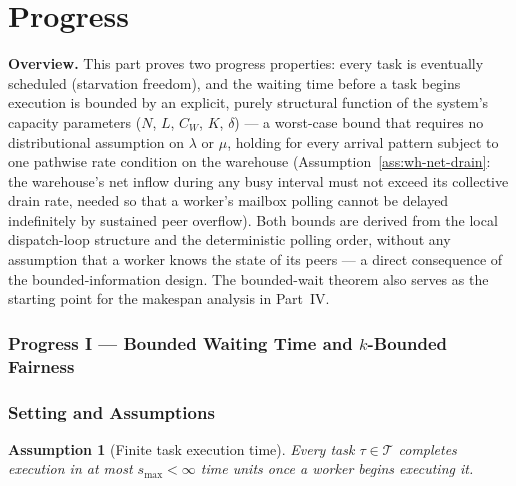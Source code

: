 \documentclass[11pt,a4paper]{article}
\newcommand{\partbreak}{\clearpage\phantomsection}
\newtheorem{assumption}{Assumption}[section]
\begin{document}
\partbreak
\part{Progress}

\bigskip
\noindent\textbf{Overview.}
This part proves two progress properties: every task is eventually
scheduled (starvation freedom), and the waiting time before a task
begins execution is bounded by an explicit, purely structural function
of the system's capacity parameters ($N$, $L$, $C_W$, $K$, $\delta$) ---
a worst-case bound that requires no distributional assumption on
$\lambda$ or $\mu$, holding for every arrival pattern subject to one
pathwise rate condition on the warehouse (Assumption~\ref{ass:wh-net-drain}:
the warehouse's net inflow during any busy interval must not exceed its
collective drain rate, needed so that a worker's mailbox polling cannot
be delayed indefinitely by sustained peer overflow). Both bounds are
derived from the local dispatch-loop structure and the deterministic
polling order, without any assumption that a worker knows the state of
its peers --- a direct consequence of the bounded-information design.
The bounded-wait theorem
also serves as the starting point for the makespan analysis in Part~IV.



\section*{Progress I --- Bounded Waiting Time and $k$-Bounded Fairness}
\label{chap:bounded_wait}
\setcounter{section}{0}


\section{Setting and Assumptions}

\begin{assumption}[Finite task execution time]
\label{ass:smax}
Every task $\tau \in \mathcal{T}$ completes execution in at most
$s_{\max} < \infty$ time units once a worker begins executing it.
\end{assumption}
\end{document}
